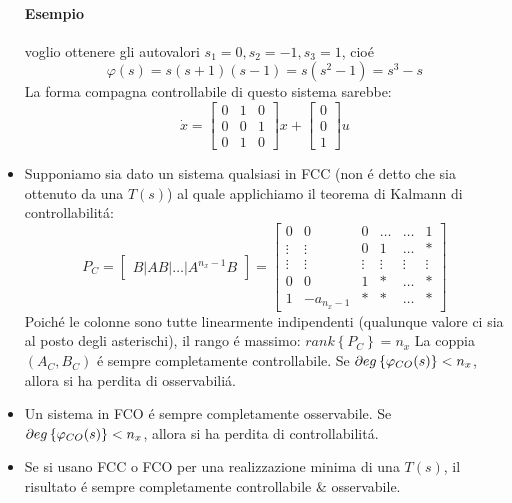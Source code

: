 \documentclass[../main.tex]{subfiles}
\begin{document}
\begin{itemize}
\begin{mdframed}[style=Esempio]
					\paragraph{Esempio} voglio ottenere gli autovalori $ s_1 = 0, s_2 = -1, s_3 = 1 $, cio\'e
						\[
							\varphi(s) = s(s+1)(s-1) = s(s^2-1) = s^3 - s
						\]
						La forma compagna controllabile di questo sistema sarebbe:
						\[
							\dot x =
							\begin{bmatrix}
								0 & 1 & 0\\
								0 & 0 & 1\\
								0 & 1 & 0
							\end{bmatrix} x+
							\begin{bmatrix}
								0\\
								0\\
								1
							\end{bmatrix} u
						\]
				\end{mdframed}
			\item 
				Supponiamo sia dato un sistema qualsiasi in FCC (non \'e detto che sia ottenuto da una $ T(s) $) al quale applichiamo il teorema di Kalmann di controllabilit\'a:
				\[
					P_C =
					\begin{bmatrix}
						B | AB | \dots | A^{n_x-1}B
					\end{bmatrix} =
					\begin{bmatrix}
						0 		& 0 		& 0 		& \dots 	& \dots 	& 1\\
						\vdots 	& \vdots 	& 0			& 1 		& \dots		& *\\
						\vdots 	& \vdots	& \vdots	& \vdots	& \vdots	& \vdots\\
						0 		& 0 		& 1 		& *		 	& \dots 	& *\\
						1 		& -a_{n_x-1} & * 		& * 	& \dots		& *
					\end{bmatrix}
				\]
				Poich\'e le colonne sono tutte linearmente indipendenti (qualunque valore ci sia al posto degli asterischi), il rango \'e massimo: $ rank \left\lbrace P_C \right\rbrace = n_x $ 
				La coppia $ (A_C, B_C) $ \'e sempre completamente controllabile. Se $ \partial eg \left\lbrace \varphi_{CO}(s) \right\rbrace < n_x $, allora si ha perdita di osservabili\'a.
			\item 
				Un sistema in FCO \'e sempre completamente osservabile. Se  $ \partial eg \left\lbrace \varphi_{CO}(s) \right\rbrace < n_x $, allora si ha perdita di controllabilit\'a.
			\item 
				Se si usano FCC o FCO per una realizzazione minima di una $ T(s) $, il risultato \'e sempre completamente controllabile \& osservabile.
				

\end{itemize}
\end{document}
